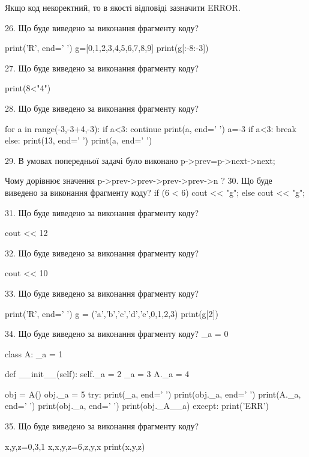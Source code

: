 \documentclass[11pt]{article}
\begin{document}
Якщо код некоректний, то в якості відповіді зазначити ERROR.



26. Що буде виведено за виконання фрагменту коду?

print('R', end=' ')
g=[0,1,2,3,4,5,6,7,8,9]
print(g[:-8:-3])


27. Що буде виведено за виконання фрагменту коду?

print(8<"4")

28. Що буде виведено за виконання фрагменту коду?

for a in range(-3,-3+4,-3):
    if a<3:
        continue
    print(a, end=' ')
    a=-3
    if a<3:
        break
else:
    print(13, end=' ')
print(a, end=' ')

29. 
В умовах попередньої задачі було виконано p->prev=p->next->next;

Чому дорівнює значення p->prev->prev->prev->prev->n ?
30. Що буде виведено за виконання фрагменту коду?
if (6 < 6)
    cout << "g";
else
    cout << "g";


31. Що буде виведено за виконання фрагменту коду?

cout << 12 %

32. Що буде виведено за виконання фрагменту коду?

cout << 10 %

33. Що буде виведено за виконання фрагменту коду?

print('R', end=' ')
g = ('a','b','c','d','e',0,1,2,3)
print(g[2])


34. Що буде виведено за виконання фрагменту коду?
_a = 0

class A:
    _a = 1
    
    def __init__(self):
        self._a = 2
        _a = 3
        A._a = 4

obj = A()
obj._a = 5
try:
    print(_a, end=' ')
    print(obj._a, end=' ')
    print(A._a, end=' ')
    print(obj._a, end=' ')
    print(obj._A__a)
except:
    print('ERR')

35. Що буде виведено за виконання фрагменту коду?

x,y,z=0,3,1
x,x,y,z=6,z,y,x
print(x,y,z)
\end{document}
